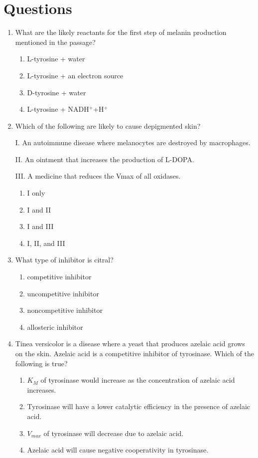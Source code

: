 \documentclass{article}
\begin{document}
\section*{Questions}
\begin{enumerate}
    \item What are the likely reactants for the first step of melanin production mentioned in the passage?
    \begin{enumerate}
        \item L-tyrosine + water
        \item L-tyrosine + an electron source
        \item D-tyrosine + water
        \item L-tyrosine + NADH$^+$+H$^+$
    \end{enumerate}
    
    \item Which of the following are likely to cause depigmented skin?
    
    I. An autoimmune disease where melanocytes are destroyed by macrophages.

    II. An ointment that increases the production of L-DOPA.

    III. A medicine that reduces the Vmax of all oxidases.
    
    \begin{enumerate}
        \item I only
        \item I and II
        \item I and III
        \item I, II, and III
    \end{enumerate}

    \item What type of inhibitor is citral?
    \begin{enumerate}
        \item competitive inhibitor
        \item uncompetitive inhibitor
        \item noncompetitive inhibitor
        \item allosteric inhibitor
    \end{enumerate}

    \item Tinea versicolor is a disease where a yeast that produces azelaic acid grows on the skin. Azelaic acid is a competitive inhibitor of tyrosinase. Which of the following is true?
    \begin{enumerate}
        \item $K_M$ of tyrosinase would increase as the concentration of azelaic acid increases.
        \item Tyrosinase will have a lower catalytic efficiency in the presence of azelaic acid.
        \item $V_{max}$ of tyrosinase will decrease due to azelaic acid.
        \item Azelaic acid will cause negative cooperativity in tyrosinase.
    \end{enumerate}


\end{enumerate}
\end{document}
